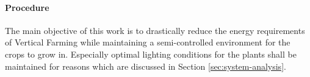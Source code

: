 







\paragraph{Procedure}
The main objective of this work is to drastically reduce the energy requirements of Vertical Farming while maintaining a semi-controlled environment for the crops to grow in.
Especially optimal lighting conditions for the plants shall be maintained for reasons which are discussed in Section \ref{sec:system-analysis}.


